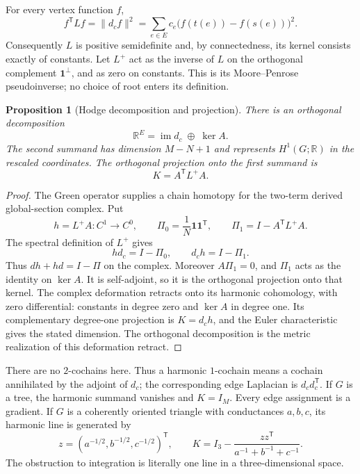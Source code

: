 \documentclass[11pt]{article}
\newtheorem{proposition}[theorem]{Proposition}
\theoremstyle{definition}
\theoremstyle{remark}
\newcommand{\R}{\mathbb R}
\begin{document}
For every vertex function $f$,
\begin{equation}\label{eq:glin-energy}
 f^{\mathsf T}Lf=\|d_cf\|^2
 =\sum_{e\in E}c_e\bigl(f(t(e))-f(s(e))\bigr)^2.
\end{equation}
Consequently $L$ is positive semidefinite and, by connectedness, its kernel consists exactly of constants. Let $L^+$ act as the inverse of $L$ on the orthogonal complement $\mathbf1^\perp$, and as zero on constants. This is its Moore--Penrose pseudoinverse; no choice of root enters its definition.

\begin{proposition}[Hodge decomposition and projection]\label{prop:glin-hodge}
There is an orthogonal decomposition
\[
 \R^E=\operatorname{im}d_c\;\mathbin\oplus\;\ker A.
\]
The second summand has dimension $M-N+1$ and represents $H^1(G;\R)$ in the rescaled coordinates. The orthogonal projection onto the first summand is
\begin{equation}\label{eq:glin-projection}
 K=A^{\mathsf T}L^+A.
\end{equation}
\end{proposition}
\begin{proof}
The Green operator supplies a chain homotopy for the two-term derived global-section complex. Put
\[
 h=L^+A:C^1\longrightarrow C^0,
 \qquad \Pi_0=\frac1N\mathbf1\mathbf1^{\mathsf T},
 \qquad \Pi_1=I-A^{\mathsf T}L^+A.
\]
The spectral definition of $L^+$ gives
\[
 hd_c=I-\Pi_0,\qquad d_ch=I-\Pi_1.
\]
Thus $dh+hd=I-\Pi$ on the complex. Moreover $A\Pi_1=0$, and $\Pi_1$ acts as the identity on $\ker A$. It is self-adjoint, so it is the orthogonal projection onto that kernel. The complex deformation retracts onto its harmonic cohomology, with zero differential: constants in degree zero and $\ker A$ in degree one. Its complementary degree-one projection is $K=d_ch$, and the Euler characteristic gives the stated dimension. The orthogonal decomposition is the metric realization of this deformation retract.
\end{proof}

There are no $2$-cochains here. Thus a harmonic $1$-cochain means a cochain annihilated by the adjoint of $d_c$; the corresponding edge Laplacian is $d_cd_c^{\mathsf T}$. If $G$ is a tree, the harmonic summand vanishes and $K=I_M$. Every edge assignment is a gradient. If $G$ is a coherently oriented triangle with conductances $a,b,c$, its harmonic line is generated by
\[
 z=(a^{-1/2},b^{-1/2},c^{-1/2})^{\mathsf T},\qquad
 K=I_3-\frac{zz^{\mathsf T}}{a^{-1}+b^{-1}+c^{-1}}.
\]
The obstruction to integration is literally one line in a three-dimensional space.
\end{document}
